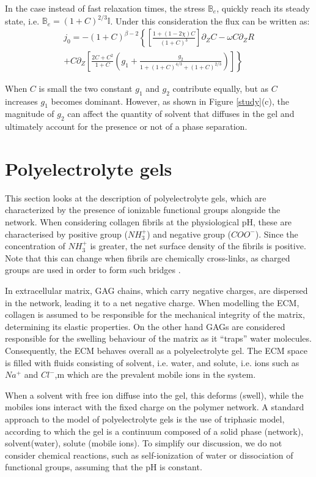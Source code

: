 \documentclass[12pt]{extarticle}
\newcommand{\B}{\ensuremath{\mathbb{B}}}
\begin{document}
In the case instead of fast relaxation times, the stress $\B_e$, quickly reach its steady state, i.e. $\mathbb{B}_e=(1+C)^{2/3}\mathbb{I}$. Under this consideration the flux can be written as:
\begin{equation*}
\begin{aligned}
	j_0= -(1+C)^{\beta-2} \left\{\left[\frac{1+(1-2\chi)C}{(1+C)^3}\right]\partial_Z C -\omega C \partial_Z R\right.\\
	\left.+ C\partial_Z\left[\frac{2C+C^2}{1+C} \left(g_1 + \frac{g_2}{ 1+(1+C)^{4/3}+(1+C)^{2/3}}\right)\right]\right\}
\end{aligned}
\end{equation*}

When $C$ is small the two constant $g_1$ and $g_2$ contribute equally, but as $C$ increases $g_1$ becomes dominant. However, as shown in Figure \ref{study}(c), the magnitude of $g_2$ can affect the quantity of solvent that diffuses in the gel and ultimately account for the presence or not of a phase separation. 
\section{Polyelectrolyte gels}

This section looks at the description of polyelectrolyte gels, which are characterized by the presence of ionizable functional groups alongside the network. When considering collagen fibrils at the physiological pH, these are characterised by positive group ($NH_3^+$) and negative group ($COO^{-}$). Since the concentration of $NH_3^+$ is greater, the net surface density of the fibrils is positive. Note that this can change when fibrils are chemically cross-links, as charged groups are used in order to form such bridges \cite{chargedensity}.  

In extracellular matrix, GAG chains, which carry negative charges, are dispersed in the network, leading it to a net negative charge. When modelling the ECM, collagen is assumed to be responsible for the mechanical integrity of the matrix, determining its elastic properties. On the other hand GAGs are considered responsible for the swelling behaviour of the matrix as it \textquotedblleft traps'' water molecules. Consequently, the ECM behaves overall as a polyelectrolyte gel. The ECM space is filled with fluids consisting of solvent, i.e. water, and solute, i.e. ions such as $Na^+$ and $Cl^-$,m which are the prevalent mobile ions in the system.

When a solvent with free ion diffuse into the gel, this deforms (swell), while the mobiles ions interact with the fixed charge on the polymer network. A standard approach to the model of polyelectrolyte gels is the use of triphasic model, according to which the gel is a continuum composed of a solid phase (network), solvent(water), solute (mobile ions). To simplify our discussion, we do not consider chemical reactions, such as self-ionization of water or dissociation of functional groups, assuming that the pH is constant. 
\end{document}
